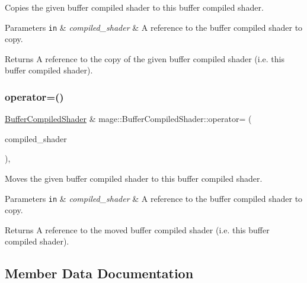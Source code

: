 Copies the given buffer compiled shader to this buffer compiled shader.


\begin{DoxyParams}[1]{Parameters}
\mbox{\tt in}  & {\em compiled\+\_\+shader} & A reference to the buffer compiled shader to copy. \\
\hline
\end{DoxyParams}
\begin{DoxyReturn}{Returns}
A reference to the copy of the given buffer compiled shader (i.\+e. this buffer compiled shader). 
\end{DoxyReturn}
\hypertarget{classmage_1_1_buffer_compiled_shader_a23a22f61d8b81eedfc691f787c6b2111}{}\label{classmage_1_1_buffer_compiled_shader_a23a22f61d8b81eedfc691f787c6b2111} 
\subsubsection{\texorpdfstring{operator=()}{operator=()}\hspace{0.1cm}{\footnotesize\ttfamily [2/2]}}
{\footnotesize\ttfamily \hyperlink{classmage_1_1_buffer_compiled_shader}{Buffer\+Compiled\+Shader} \& mage\+::\+Buffer\+Compiled\+Shader\+::operator= (\begin{DoxyParamCaption}\item[{\hyperlink{classmage_1_1_buffer_compiled_shader}{Buffer\+Compiled\+Shader} \&\&}]{compiled\+\_\+shader }\end{DoxyParamCaption})\hspace{0.3cm}{\ttfamily [default]}, {\ttfamily [noexcept]}}

Moves the given buffer compiled shader to this buffer compiled shader.


\begin{DoxyParams}[1]{Parameters}
\mbox{\tt in}  & {\em compiled\+\_\+shader} & A reference to the buffer compiled shader to copy. \\
\hline
\end{DoxyParams}
\begin{DoxyReturn}{Returns}
A reference to the moved buffer compiled shader (i.\+e. this buffer compiled shader). 
\end{DoxyReturn}


\subsection{Member Data Documentation}
\hypertarget{classmage_1_1_buffer_compiled_shader_a76b0b5a034c4d8b8fd0d424cac66dccc}{}\label{classmage_1_1_buffer_compiled_shader_a76b0b5a034c4d8b8fd0d424cac66dccc} 
